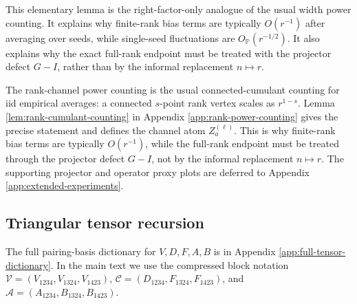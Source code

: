\documentclass{article}
\newcommand{\E}{\mathbb E}
\newcommand{\Pp}{\mathbb P}
\newcommand{\cumul}{\operatorname{cum}}
\begin{document}
This elementary lemma is the right-factor-only analogue of the usual width power counting. It explains why finite-rank bias terms are typically \(O(r^{-1})\) after averaging over seeds, while single-seed fluctuations are \(O_{\Pp}(r^{-1/2})\). It also explains why the exact full-rank endpoint must be treated with the projector defect \(G-I\), rather than by the informal replacement \(n\mapsto r\).
\fi

The rank-channel power counting is the usual connected-cumulant counting for iid empirical averages: a connected \(s\)-point rank vertex scales as \(r^{1-s}\). Lemma \ref{lem:rank-cumulant-counting} in Appendix \ref{app:rank-power-counting} gives the precise statement and defines the channel atom \(Z_a^{(\ell)}\). This is why finite-rank bias terms are typically \(O(r^{-1})\), while the full-rank endpoint must be treated through the projector defect \(G-I\), not by the informal replacement \(n\mapsto r\). The supporting projector and operator proxy plots are deferred to Appendix \ref{app:extended-experiments}.



\vspace{-1.0em}
\subsection{Triangular tensor recursion}
The full pairing-basis dictionary for \(V,D,F,A,B\) is in Appendix \ref{app:full-tensor-dictionary}. In the main text we use the compressed block notation \(\mathcal V=(V_{1234},V_{1324},V_{1423})\), \(\mathcal C=(D_{1234},F_{1324},F_{1423})\), and \(\mathcal A=(A_{1234},B_{1324},B_{1423})\).

\end{document}
